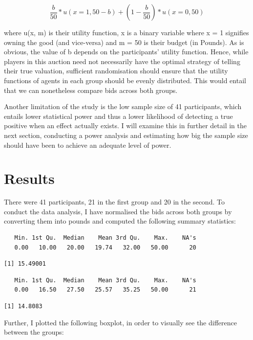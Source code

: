 \documentclass[
]{report}
\begin{document}
\[\frac{b}{50} * u(x = 1, 50 - b) + (1 - \frac{b}{50}) * u(x = 0, 50)\]

where u(x, m) is their utility function, x is a binary variable where x
= 1 signifies owning the good (and vice-versa) and m = 50 is their
budget (in Pounds). As is obvious, the value of b depends on the
participants' utility function. Hence, while players in this auction
need not necessarily have the optimal strategy of telling their true
valuation, sufficient randomisation should ensure that the utility
functions of agents in each group should be evenly distributed. This
would entail that we can nonetheless compare bids across both groups.

Another limitation of the study is the low sample size of 41
participants, which entails lower statistical power and thus a lower
likelihood of detecting a true positive when an effect actually exists.
I will examine this in further detail in the next section, conducting a
power analysis and estimating how big the sample size should have been
to achieve an adequate level of power.

\chapter{Results}\label{results}

There were 41 participants, 21 in the first group and 20 in the second.
To conduct the data analysis, I have normalised the bids across both
groups by converting them into pounds and computed the following summary
statistics:

\begin{verbatim}
   Min. 1st Qu.  Median    Mean 3rd Qu.    Max.    NA's 
   0.00   10.00   20.00   19.74   32.00   50.00      20 
\end{verbatim}

\begin{verbatim}
[1] 15.49001
\end{verbatim}

\begin{verbatim}
   Min. 1st Qu.  Median    Mean 3rd Qu.    Max.    NA's 
   0.00   16.50   27.50   25.57   35.25   50.00      21 
\end{verbatim}

\begin{verbatim}
[1] 14.8083
\end{verbatim}

Further, I plotted the following boxplot, in order to visually see the
difference between the groups:
\end{document}
